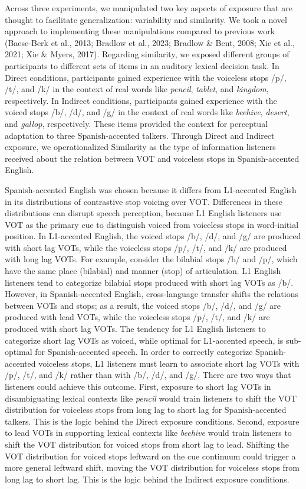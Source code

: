 \documentclass[
  12pt,
  twoside]{article}
\begin{document}
Across three experiments, we manipulated two key aspects of exposure that are thought to facilitate generalization: variability and similarity.
We took a novel approach to implementing these manipulations compared to previous work (Baese-Berk et al., 2013; Bradlow et al., 2023; Bradlow \& Bent, 2008; Xie et al., 2021; Xie \& Myers, 2017).
Regarding similarity, we exposed different groups of participants to different sets of items in an auditory lexical decision task.
In Direct conditions, participants gained experience with the voiceless stops /p/, /t/, and /k/ in the context of real words like \emph{pencil}, \emph{tablet}, and \emph{kingdom}, respectively.
In Indirect conditions, participants gained experience with the voiced stops /b/, /d/, and /g/ in the context of real words like \emph{beehive}, \emph{desert}, and \emph{gallop}, respectively.
These items provided the context for perceptual adaptation to three Spanish-accented talkers.
Through Direct and Indirect exposure, we operationalized Similarity as the type of information listeners received about the relation between VOT and voiceless stops in Spanish-accented English.

Spanish-accented English was chosen because it differs from L1-accented English in its distributions of contrastive stop voicing over VOT.
Differences in these distributions can disrupt speech perception, because L1 English listeners use VOT as the primary cue to distinguish voiced from voiceless stops in word-initial position.
In L1-accented English, the voiced stops /b/, /d/, and /g/ are produced with short lag VOTs, while the voiceless stops /p/, /t/, and /k/ are produced with long lag VOTs.
For example, consider the bilabial stops /b/ and /p/, which have the same place (bilabial) and manner (stop) of articulation.
L1 English listeners tend to categorize bilabial stops produced with short lag VOTs as /b/.
However, in Spanish-accented English, cross-language transfer shifts the relations between VOTs and stops; as a result, the voiced stops /b/, /d/, and /g/ are produced with lead VOTs, while the voiceless stops /p/, /t/, and /k/ are produced with short lag VOTs.
The tendency for L1 English listeners to categorize short lag VOTs as voiced, while optimal for L1-accented speech, is sub-optimal for Spanish-accented speech.
In order to correctly categorize Spanish-accented voiceless stops, L1 listeners must learn to associate short lag VOTs with /p/, /t/, and /k/ rather than with /b/, /d/, and /g/.
There are two ways that listeners could achieve this outcome.
First, exposure to short lag VOTs in disambiguating lexical contexts like \emph{pencil} would train listeners to shift the VOT distribution for voiceless stops from long lag to short lag for Spanish-accented talkers.
This is the logic behind the Direct exposure conditions.
Second, exposure to lead VOTs in supporting lexical contexts like \emph{beehive} would train listeners to shift the VOT distribution for voiced stops from short lag to lead.
Shifting the VOT distribution for voiced stops leftward on the cue continuum could trigger a more general leftward shift, moving the VOT distribution for voiceless stops from long lag to short lag.
This is the logic behind the Indirect exposure conditions.
\end{document}
